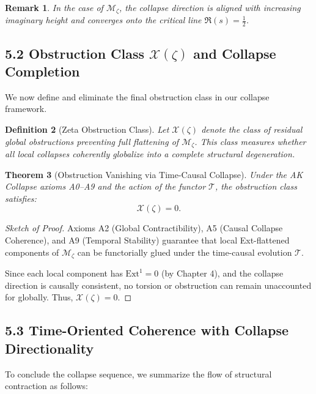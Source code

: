 \documentclass[11pt]{article}
\newtheorem{theorem}{Theorem}[section]
\newtheorem{definition}[theorem]{Definition}
\newtheorem{remark}[theorem]{Remark}
\newcommand{\Sha}{\mathcal{X}}
\begin{document}
\begin{remark}
In the case of $\mathcal{M}_\zeta$, the collapse direction is aligned with increasing imaginary height and converges onto the critical line $\Re(s) = \tfrac{1}{2}$.
\end{remark}

\subsection{5.2 Obstruction Class $\Sha(\zeta)$ and Collapse Completion}

We now define and eliminate the final obstruction class in our collapse framework.

\begin{definition}[Zeta Obstruction Class]
Let $\Sha(\zeta)$ denote the class of residual global obstructions preventing full flattening of $\mathcal{M}_\zeta$.  
This class measures whether all local collapses coherently globalize into a complete structural degeneration.
\end{definition}

\begin{theorem}[Obstruction Vanishing via Time-Causal Collapse]
Under the AK Collapse axioms A0–A9 and the action of the functor $\mathcal{T}$, the obstruction class satisfies:
\[
\Sha(\zeta) = 0.
\]
\end{theorem}

\begin{proof}[Sketch of Proof]
Axioms A2 (Global Contractibility), A5 (Causal Collapse Coherence), and A9 (Temporal Stability)  
guarantee that local Ext-flattened components of $\mathcal{M}_\zeta$ can be functorially glued under the time-causal evolution $\mathcal{T}$.

Since each local component has $\mathrm{Ext}^1 = 0$ (by Chapter 4), and the collapse direction is causally consistent,  
no torsion or obstruction can remain unaccounted for globally. Thus, $\Sha(\zeta) = 0$.
\end{proof}

\subsection{5.3 Time-Oriented Coherence with Collapse Directionality}

To conclude the collapse sequence, we summarize the flow of structural contraction as follows:

\begin{center}
\end{center}
\end{document}

